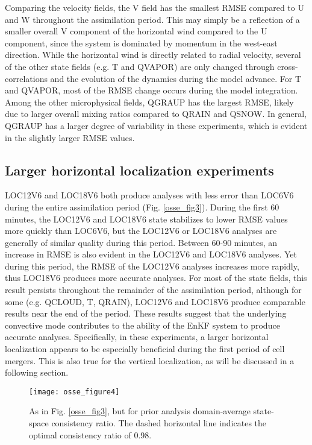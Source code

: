 Comparing the velocity fields, the V field has the smallest RMSE compared to U and W throughout the assimilation period. This may simply be a reflection of a smaller overall V component of the horizontal wind compared to the U component, since the system is dominated by momentum in the west-east direction. While the horizontal wind is directly related to radial velocity, several of the other state fields (e.g. T and QVAPOR) are only changed through cross-correlations and the evolution of the dynamics during the model advance. For T and QVAPOR, most of the RMSE change occurs during the model integration. Among the other microphysical fields, QGRAUP has the largest RMSE, likely due to larger overall mixing ratios compared to QRAIN and QSNOW. In general, QGRAUP has a larger degree of variability in these experiments, which is evident in the slightly larger RMSE values.

\subsection{Larger horizontal localization experiments}
LOC12V6 and LOC18V6 both produce analyses with less error than LOC6V6 during the entire assimilation period (Fig. \ref{osse_fig3}). During the first 60 minutes, the LOC12V6 and LOC18V6 state stabilizes to lower RMSE values more quickly than LOC6V6, but the LOC12V6 or LOC18V6 analyses are generally of similar quality during this period. Between 60-90 minutes, an increase in RMSE is also evident in the LOC12V6 and LOC18V6 analyses. Yet during this period, the RMSE of the LOC12V6 analyses increases more rapidly, thus LOC18V6 produces more accurate analyses. For most of the state fields, this result persists throughout the remainder of the assimilation period, although for some (e.g. QCLOUD, T, QRAIN), LOC12V6 and LOC18V6 produce comparable results near the end of the period. These results suggest that the underlying convective mode contributes to the ability of the EnKF system to produce accurate analyses. Specifically, in these experiments, a larger horizontal localization appears to be especially beneficial during the first period of cell mergers. This is also true for the vertical localization, as will be discussed in a following section.

\begin{figure}
\centering
\texttt{[image: osse\_figure4]}
\caption{As in Fig. \ref{osse_fig3}, but for prior analysis domain-average state-space consistency ratio. The dashed horizontal line indicates the optimal consistency ratio of 0.98.}
\label{osse_fig4}
\end{figure}

